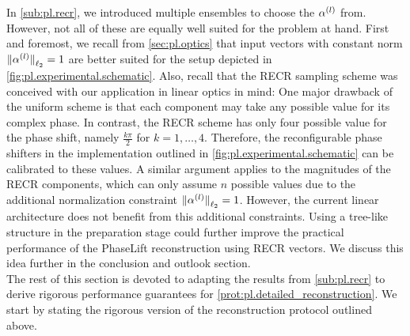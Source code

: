 In \cref{sub:pl.recr}, we introduced multiple ensembles to choose the $\alpha^{(l)}$ from.
However, not all of these are equally well suited for the problem at hand.
First and foremost, we recall from \cref{sec:pl.optics} that input vectors with constant norm ${\Vert\alpha^{(l)}\Vert}_{\ell_2} = 1$ are better suited for the setup depicted in \cref{fig:pl.experimental.schematic}.
Also, recall that the RECR sampling scheme was conceived with our application in linear optics in mind:
One major drawback of the uniform scheme is that each component may take any possible value for its complex phase.
In contrast, the RECR scheme has only four possible value for the phase shift, namely $\frac{k \pi}{2}$ for $k=1,\ldots,4$.
Therefore, the reconfigurable phase shifters in the implementation outlined in \cref{fig:pl.experimental.schematic} can be calibrated to these values.
A similar argument applies to the magnitudes of the RECR components, which can only assume $n$ possible values due to the additional normalization constraint ${\Vert\alpha^{(l)}\Vert}_{\ell_2} = 1$.
However, the current linear architecture does not benefit from this additional constraints.
Using a tree-like structure in the preparation stage could further improve the practical performance of the PhaseLift reconstruction using RECR vectors.
We discuss this idea further in the conclusion and outlook section.\\



The rest of this section is devoted to adapting the results from \cref{sub:pl.recr} to derive rigorous performance guarantees for \cref{prot:pl.detailed_reconstruction}.
We start by stating the rigorous version of the reconstruction protocol outlined above.

